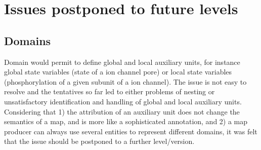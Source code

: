 \chapter{Issues postponed to future levels}\label{sec:postponed}

\section{Domains}\label{sec:unresolved_domain}

Domain would permit to define global and local auxiliary units, for instance global state variables (state of a ion channel pore) or local state variables (phosphorylation of a given subunit of a ion channel). The issue is not easy to resolve and the tentatives so far led to either problems of nesting or unsatisfactory identification and handling of global and local auxiliary units. Considering that 1) the attribution of an auxiliary unit does not change the semantics of a map, and is more like a sophisticated annotation, and 2) a map producer can always use several entities to represent different domains, it was felt that the issue should be postponed to a further level/version.